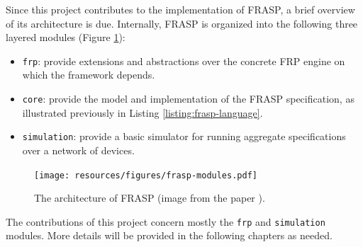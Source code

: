 Since this project contributes to the implementation of FRASP, a brief overview
of its architecture is due. Internally, FRASP is organized into the following
three layered modules (Figure \ref{figure:frasp-modules}):
\begin{itemize}
  \item \texttt{frp}: provide extensions and abstractions over the concrete
        \ac{FRP} engine on which the framework depends.
  \item \texttt{core}: provide the model and implementation of the FRASP
        specification, as illustrated previously in Listing
        \ref{listing:frasp-language}.
  \item \texttt{simulation}: provide a basic simulator for running aggregate
        specifications over a network of devices.
\end{itemize}
\begin{figure}[!ht]
  \centering
  \texttt{[image: resources/figures/frasp-modules.pdf]}
  \caption[The architecture of FRASP]{The architecture of FRASP (image from the paper \cite{FRASP}).}
  \label{figure:frasp-modules}
\end{figure}

The contributions of this project concern mostly the \texttt{frp} and
\texttt{simulation} modules. More details will be provided in the following
chapters as needed.
